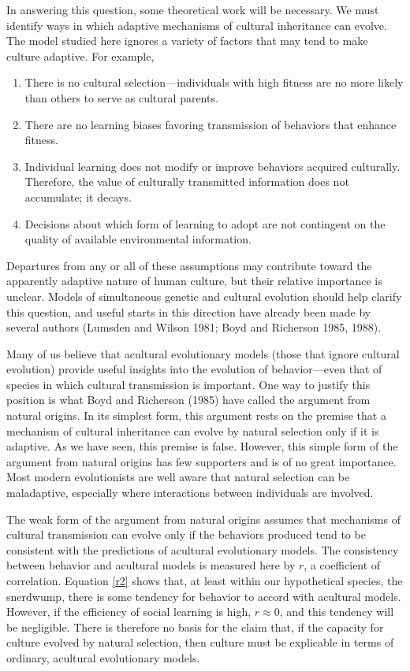 \documentclass[11pt]{article}
\begin{document}
In answering this question, some theoretical work will be necessary.  We
must identify ways in which adaptive mechanisms of cultural inheritance
can evolve.  The model studied here ignores a variety of factors that may
tend to make culture adaptive.  For example, 
\begin{enumerate}
\item There is no cultural selection---individuals with high fitness are
no more likely than others to serve as cultural parents.
\item There are no learning biases favoring transmission of
behaviors that enhance fitness.
\item Individual learning does not modify or improve behaviors acquired
culturally.  Therefore, the value of culturally transmitted information
does not accumulate; it decays.  
\item Decisions about which form of learning to adopt are not contingent on
the quality of available environmental information.
\end{enumerate} 
Departures from any or all of these assumptions may contribute toward the
apparently adaptive nature of human culture, but their relative importance
is unclear.  Models of simultaneous genetic and cultural evolution should
help clarify this question, and useful starts in this direction have
already been made by several authors (Lumsden and Wilson 1981; Boyd and
Richerson 1985, 1988).

Many of us believe that acultural evolutionary models (those that ignore
cultural evolution) provide useful insights into the evolution of 
behavior---even that of species in which cultural transmission is
important.  One way to justify this position is what Boyd and Richerson
(1985) have called the argument from natural origins.  In its simplest
form, this argument rests on the premise that a mechanism of cultural
inheritance can evolve by natural selection only if it is adaptive.  As
we have seen, this premise is false.  However, this simple form of the
argument from natural origins has few supporters and is of no great
importance.  Most modern evolutionists are well aware that natural
selection can be maladaptive, especially where interactions between
individuals are involved.

The weak form of the argument from natural origins assumes that
mechanisms of cultural transmission can evolve only if the behaviors
produced tend to be consistent with the predictions of acultural
evolutionary models.  The consistency between behavior and acultural
models is measured here by $r$, a coefficient of correlation.  Equation
\ref{r2} shows that, at least within our hypothetical species, the
snerdwump, there is some tendency for behavior to accord with acultural
models.  However, if the efficiency of social learning is high, 
$r \approx 0$, and this tendency will be negligible.  There is therefore
no basis for the claim that, if the capacity for culture evolved by
natural selection, then culture must be explicable in terms of ordinary,
acultural evolutionary models.
\end{document}
